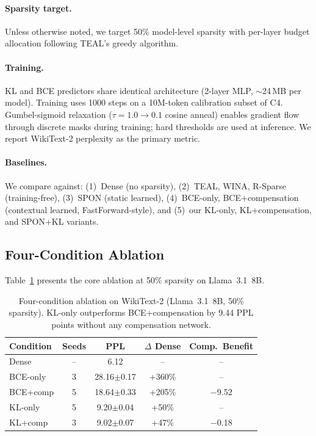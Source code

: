 \documentclass[11pt,a4paper]{article}
\begin{document}
\paragraph{Sparsity target.}
Unless otherwise noted, we target 50\% model-level sparsity with per-layer budget allocation following TEAL's greedy algorithm.

\paragraph{Training.}
KL and BCE predictors share identical architecture (2-layer MLP, $\sim$24\,MB per model).
Training uses 1000 steps on a 10M-token calibration subset of C4.
Gumbel-sigmoid relaxation ($\tau = 1.0 \to 0.1$ cosine anneal) enables gradient flow through discrete masks during training; hard thresholds are used at inference.
We report WikiText-2 perplexity as the primary metric.

\paragraph{Baselines.}
We compare against: (1)~Dense (no sparsity), (2)~TEAL, WINA, R-Sparse (training-free), (3)~SPON (static learned), (4)~BCE-only, BCE+compensation (contextual learned, FastForward-style), and (5)~our KL-only, KL+compensation, and SPON+KL variants.

\subsection{Four-Condition Ablation}
\label{sec:ablation}

Table~\ref{tab:ablation} presents the core ablation at 50\% sparsity on Llama~3.1~8B.

\begin{table}[t]
\centering
\small
\caption{Four-condition ablation on WikiText-2 (Llama~3.1~8B, 50\% sparsity). KL-only outperforms BCE+compensation by 9.44 PPL points without any compensation network.}
\label{tab:ablation}
\begin{tabular}{lcccc}
\toprule
\textbf{Condition} & \textbf{Seeds} & \textbf{PPL} & \textbf{$\Delta$ Dense} & \textbf{Comp.\ Benefit} \\
\midrule
Dense & -- & 6.12 & -- & -- \\
BCE-only & 3 & 28.16\small{$\pm$0.17} & +360\% & -- \\
BCE+comp & 5 & 18.64\small{$\pm$0.33} & +205\% & $-$9.52 \\
KL-only & 5 & 9.20\small{$\pm$0.04} & +50\% & -- \\
KL+comp & 3 & 9.02\small{$\pm$0.07} & +47\% & $-$0.18 \\
\bottomrule
\end{tabular}
\end{table}
\end{document}
